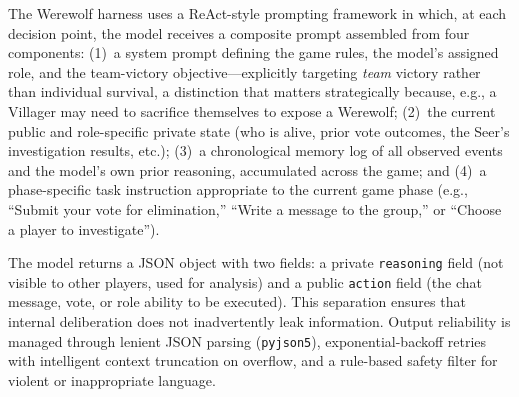 \documentclass{article}
\begin{document}
The Werewolf harness uses a ReAct-style prompting framework in which, at each decision point, the model receives a composite prompt assembled from four components: (1)~a system prompt defining the game rules, the model's assigned role, and the team-victory objective---explicitly targeting \emph{team} victory rather than individual survival, a distinction that matters strategically because, e.g., a Villager may need to sacrifice themselves to expose a Werewolf; (2)~the current public and role-specific private state (who is alive, prior vote outcomes, the Seer's investigation results, etc.); (3)~a chronological memory log of all observed events and the model's own prior reasoning, accumulated across the game; and (4)~a phase-specific task instruction appropriate to the current game phase (e.g., ``Submit your vote for elimination,'' ``Write a message to the group,'' or ``Choose a player to investigate'').

The model returns a JSON object with two fields: a private \texttt{reasoning} field (not visible to other players, used for analysis) and a public \texttt{action} field (the chat message, vote, or role ability to be executed). This separation ensures that internal deliberation does not inadvertently leak information. Output reliability is managed through lenient JSON parsing (\texttt{pyjson5}), exponential-backoff retries with intelligent context truncation on overflow, and a rule-based safety filter for violent or inappropriate language.





\end{document}
